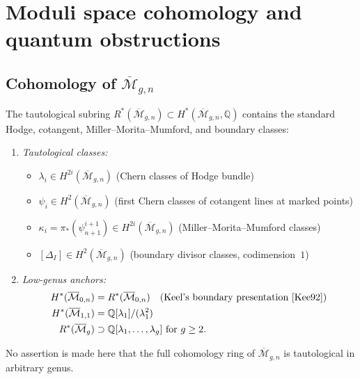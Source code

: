 \section{Moduli space cohomology and quantum obstructions}
\label{sec:moduli-cohomology-quantum}

\subsection{\texorpdfstring{Cohomology of $\overline{\mathcal{M}}_{g,n}$}{Cohomology of M-g,n}}

\begin{theorem}
\label{thm:mmm-classes}
The tautological subring
$R^*(\overline{\mathcal{M}}_{g,n})\subset
H^*(\overline{\mathcal{M}}_{g,n}, \mathbb{Q})$ contains the standard
Hodge, cotangent, Miller--Morita--Mumford, and boundary classes:
\begin{enumerate}
\item \emph{Tautological classes:}
\begin{itemize}
\item $\lambda_i \in H^{2i}(\overline{\mathcal{M}}_{g,n})$ (Chern classes of Hodge bundle)
\item $\psi_i \in H^2(\overline{\mathcal{M}}_{g,n})$ (first Chern classes of cotangent lines at marked points)
\item $\kappa_i=\pi_*(\psi_{n+1}^{i+1})\in H^{2i}(\overline{\mathcal M}_{g,n})$ (Miller--Morita--Mumford classes)
\item $[\Delta_I] \in H^{2}(\overline{\mathcal{M}}_{g,n})$ (boundary divisor classes, codimension~$1$)
\end{itemize}

\item \emph{Low-genus anchors:}
\begin{align}
H^*(\overline{\mathcal{M}}_{0,n}) &= R^*(\overline{\mathcal{M}}_{0,n})
\quad\text{(Keel's boundary presentation~\cite{Kee92})}\\
H^*(\overline{\mathcal{M}}_{1,1}) &= \mathbb{Q}[\lambda_1] / (\lambda_1^2)\\
R^*(\overline{\mathcal{M}}_g) &\supset \mathbb{Q}[\lambda_1, \ldots, \lambda_g] \text{ for } g \geq 2 .
\end{align}
\end{enumerate}
No assertion is made here that the full cohomology ring of
$\overline{\mathcal M}_{g,n}$ is tautological in arbitrary genus.
\end{theorem}

